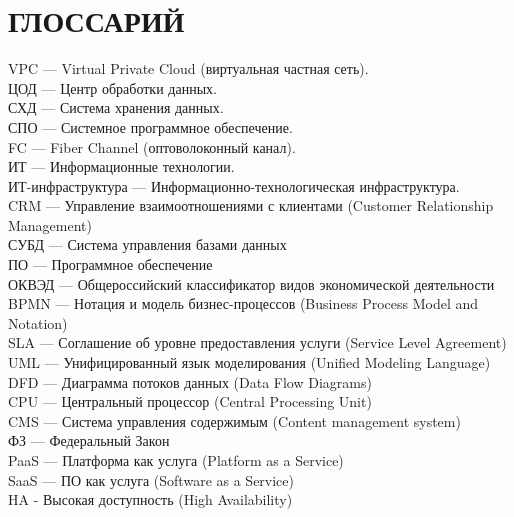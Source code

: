 \documentclass[14pt, a4paper]{extarticle}
\begin{document}
\def\contentsname{СОДЕРЖАНИЕ}

\begin{titlepage}
  
  
\end{titlepage}
\setcounter{page}{7}
\tableofcontents

\section*{ГЛОССАРИЙ}
{}
\begin{raggedright}
  VPC --- Virtual Private Cloud (виртуальная частная сеть). \\
  ЦОД --- Центр обработки данных. \\
  СХД --- Система хранения данных. \\
  СПО --- Системное программное обеспечение. \\
  FC --- Fiber Channel (оптоволоконный канал). \\
  ИТ --- Информационные технологии. \\
  ИТ-инфраструктура --- Информационно-технологическая инфраструктура. \\
  CRM --- Управление взаимоотношениями с клиентами (Customer Relationship Management) \\
  СУБД --- Система управления базами данных \\
  ПО --- Программное обеспечение \\
  ОКВЭД --- Общероссийский классификатор видов экономической деятельности \\
  BPMN --- Нотация и модель бизнес-процессов (Business Process Model and Notation) \\
  SLA --- Соглашение об уровне предоставления услуги (Service Level Agreement) \\
  UML --- Унифицированный язык моделирования (Unified Modeling Language) \\
  DFD --- Диаграмма потоков данных (Data Flow Diagrams) \\
  CPU --- Центральный процессор (Central Processing Unit)\\
  CMS --- Система управления содержимым (Content management system) \\
  ФЗ --- Федеральный Закон\\
  PaaS ---  Платформа как услуга (Platform as a Service)\\
  SaaS --- ПО как услуга (Software as a Service)\\
  HA - Высокая доступность (High Availability)\\
\end{raggedright}
\end{document}
